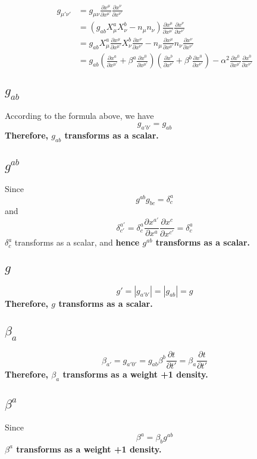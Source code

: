 \documentclass{article}
\begin{document}
\begin{align*}
g_{\mu'\nu'} & = g_{\mu\nu}\frac{\partial x^{\mu}}{\partial x^{\mu'}}\frac{\partial x^{\nu}}{\partial x^{\nu'}}\\
& = (g_{ab}X^{a}_{\mu}X^{b}_{\nu} - n_{\mu}n_{\nu})\frac{\partial x^{\mu}}{\partial x^{\mu'}}\frac{\partial x^{\nu}}{\partial x^{\nu'}}\\
& = g_{ab}X^{a}_{\mu}\frac{\partial x^{\mu}}{\partial x^{\mu'}}X^{b}_{\nu}\frac{\partial x^{\nu}}{\partial x^{\nu'}} - n_{\mu}\frac{\partial x^{\mu}}{\partial x^{\mu'}}n_{\nu}\frac{\partial x^{\nu}}{\partial x^{\nu'}}\\
& = g_{ab}(\frac{\partial x^{a}}{\partial x^{\mu '}} + \beta^{a}\frac{\partial x^{0}}{\partial x^{\mu '}})(\frac{\partial x^{b}}{\partial x^{\nu '}} + \beta^{b}\frac{\partial x^{0}}{\partial x^{\nu '}}) - \alpha^2\frac{\partial x^{0}}{\partial x^{\mu '}}\frac{\partial x^{0}}{\partial x^{\nu '}}
\end{align*}
\subsection{$g_{ab}$}
According to the formula above, we have
\[
\boxed{
g_{a'b'} = g_{ab}
}
\]
{\bf {\color{red} Therefore, $g_{ab}$ transforms as a scalar.}}
\subsection{$g^{ab}$}
Since
\[
g^{ab}g_{bc} = \delta^{a}_{c}
\]
and
\[
\delta^{a'}_{c'} = \delta^{a}_{c}\frac{\partial x^{a'}}{\partial x^{a}}\frac{\partial x^{c}}{\partial x^{c'}} = \delta^{a}_{c}
\]
$\delta^{a}_{c}$ transforms as a scalar, and {\bf {\color{red}hence $g^{ab}$ transforms as a scalar.}}
\subsection{$g$}
\[
\boxed{
g' = |g_{a'b'}| = |g_{ab}| = g
}
\]
{\bf {\color{red}Therefore, $g$ transforms as a scalar.}}
\subsection{$\beta_{a}$}
\[
\boxed{
\beta_{a'} = g_{a'0'} = g_{ab}\beta^{b}\frac{\partial t}{\partial t'} = \beta_{a}\frac{\partial t}{\partial t'}
}
\]
{\bf {\color{red}Therefore, $\beta_{a}$ transforms as a weight +1 density.}}
\subsection{$\beta^{a}$}
Since
\[
\beta^{a} = \beta_{b}g^{ab}
\]
{\bf {\color{red}$\beta^{a}$ transforms as a weight +1 density.}}
\end{document}
